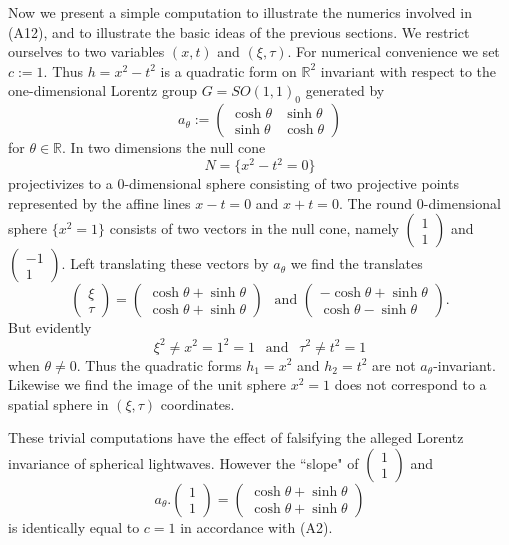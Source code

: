 \documentclass[12pt]{amsart}
\newcommand{\bR}{\mathbb{R}}
\begin{document}
Now we present a simple computation to illustrate the numerics involved in (A12), and to illustrate the basic ideas of the previous sections. We restrict ourselves to two variables $(x,t)$ and $(\xi, \tau)$. For numerical convenience we set $c:=1$. Thus $h=x^2-t^2$ is a quadratic form on $\bR^2$ invariant with respect to the one-dimensional Lorentz group $G=SO(1,1)_0$ generated by $$a_\theta:=\begin{pmatrix} \cosh \theta & \sinh \theta \\
\sinh \theta & \cosh \theta
\end{pmatrix}$$ for $\theta\in \bR$. In two dimensions the null cone $$N=\{x^2-t^2=0\}$$ projectivizes to a $0$-dimensional sphere consisting of two projective points represented by the affine lines $x-t=0$ and $x+t=0$. The round $0$-dimensional sphere $\{x^2=1\}$ consists of two vectors in the null cone, namely $\begin{pmatrix} 1 \\ 1\end{pmatrix}$ and $\begin{pmatrix} -1 \\ 1\end{pmatrix}.$ Left translating these vectors by $a_\theta$ we find the translates $$\begin{pmatrix} \xi \\ \tau \end{pmatrix}=\begin{pmatrix} \cosh \theta+\sinh \theta \\ \cosh \theta+\sinh \theta \end{pmatrix}~~\text{~and~} \begin{pmatrix} -\cosh \theta+\sinh \theta \\ \cosh \theta-\sinh \theta \end{pmatrix}.$$ But evidently $$\xi^2 \neq x^2=1^2=1 ~~\text{~and~}~~ \tau^2 \neq t^2=1$$ when $\theta\neq 0$. Thus the quadratic forms $h_1=x^2$ and $h_2=t^2$ are not $a_\theta$-invariant. Likewise we find the image of the unit sphere $x^2=1$ does not correspond to a spatial sphere in $(\xi, \tau)$ coordinates. 

These trivial computations have the effect of falsifying the alleged Lorentz invariance of spherical lightwaves. However the ``slope" of $\begin{pmatrix} 1 \\ 1\end{pmatrix}$ and $$a_\theta.\begin{pmatrix} 1 \\ 1\end{pmatrix}=\begin{pmatrix} \cosh \theta+\sinh \theta \\ \cosh \theta+\sinh \theta \end{pmatrix}$$ is identically equal to $c=1$ in accordance with (A2).
\end{document}
